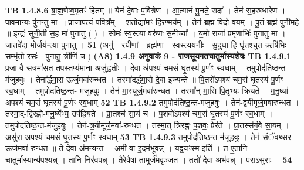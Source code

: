 \documentclass[17pt]{extarticle}
\begin{document}
                  \newline
                                \textbf{ TB 1.4.8.6} \newline
                  ब्रा॒ह्म॒णेष्व॒मृतꣳ॑ हि॒तम् ॥ येन॑ दे॒वाः प॒वित्रे॑ण । आ॒त्मानं॑ पु॒नते॒ सदा᳚ । तेन॑ स॒हस्र॑धारेण । पा॒व॒मा॒न्यः पु॑नन्तु मा ॥ प्रा॒जा॒प॒त्यं प॒वित्र᳚म् । श॒तोद्या॑मꣳ हिर॒ण्मय᳚म् । तेन॑ ब्रह्म॒ विदो॑ व॒यम् । पू॒तं ब्रह्म॑ पुनीमहे ॥ इन्द्रः॑ सुनी॒ती स॒ह मा॑ पुनातु ( ) । सोमः॑ स्व॒स्त्या वरु॑णः स॒मीच्या᳚ । य॒मो राजा᳚ प्रमृ॒णाभिः॑ पुनातु मा । जा॒तवे॑दा मो॒र्जय॑न्त्या पुनातु । \textbf{ 51} \newline
                  \newline
                                    (अनु॑ - रयी॒णां - ब्रह्म॑णा - स्व॒स्त्यय॑नीः - सु॒दुघा॒ हि घृ॑त॒श्चुत॒ ऋषि॑भिः॒ सम्भृ॑तो॒ रसः॑ - पुनातु॒ त्रीणि॑ च ) \textbf{(A8)} \newline \newline
                \textbf{ 1.4.9      अनुवाकं   9 - राजसूयगतचातुर्मास्यशेषः} \newline
                                \textbf{ TB 1.4.9.1} \newline
                  प्र॒जा वै स॒त्रमा॑सत॒ तप॒स्तप्य॑माना॒ अजु॑ह्वतीः । दे॒वा अ॑पश्यं चम॒सं घृ॒तस्य॑ पू॒र्णꣳ स्व॒धाम् । तमुपोद॑तिष्ठ॒न्त-म॑जुहवुः । तेना᳚र्द्धमा॒स ऊर्ज॒मवा॑रुन्धत । तस्मा॑दर्द्धमा॒से दे॒वा इ॑ज्यन्ते ॥ पि॒तरो॑ऽपश्यं चम॒सं घृ॒तस्य॑ पू॒र्णꣳ स्व॒धाम् । तमुपोद॑तिष्ठ॒न्त- म॑जुहवुः । तेन॑ मा॒स्यूर्ज॒मवा॑रुन्धत । तस्मा᳚न् मा॒सि पि॒तृभ्यः॑ क्रियते । म॒नु॒ष्या॑ अपश्यं चम॒सं घृ॒तस्य॑ पू॒र्णꣳ स्व॒धाम् \textbf{ 52} \newline
                  \newline
                                \textbf{ TB 1.4.9.2} \newline
                  तमुपोद॑तिष्ठ॒न्त-म॑जुहवुः । तेन॑-द्व॒यीमूर्ज॒मवा॑रुन्धत । तस्मा॒द्-द्विरह्नो॑-मनु॒ष्ये᳚भ्य॒ उप॑ह्रियते । प्रा॒तश्च॑ सा॒यं च॑ । प॒शवो॑ऽपश्यं चम॒सं घृ॒तस्य॑ पू॒र्णꣳ स्व॒धाम् । तमुपोद॑तिष्ठ॒न्त-म॑जुहवुः । तेन॑-त्र॒यीमूर्ज॒मवा॑-रुन्धत । तस्मा॒त् त्रिरह्नः॑ प॒शवः॒ प्रेर॑ते । प्रा॒तस्स॑गं॒वे सा॒यम् । असु॑रा अपश्यं चम॒सं घृ॒तस्य॑ पू॒र्णꣳ स्व॒धाम् \textbf{ 53} \newline
                  \newline
                                \textbf{ TB 1.4.9.3} \newline
                  तमुपोद॑तिष्ठ॒न्त-म॑जुहवुः । तेन॑ संॅवथ्स॒र ऊर्ज॒मवा॑-रुन्धत ॥ ते दे॒वा अ॑मन्यन्त । अ॒मी वा इ॒दम॑भूवन्न् । यद्व॒यꣳस्म इति॑ । त ए॒तानि॑ चातुर्मा॒स्यान्य॑पश्यन्न् । तानि॒ निर॑वपन्न् । तैरे॒वैषां॒ तामूर्ज॑मवृञ्जत । ततो॑ दे॒वा अभ॑वन्न् । पराऽसु॑राः । \textbf{ 54} \newline
\end{document}
